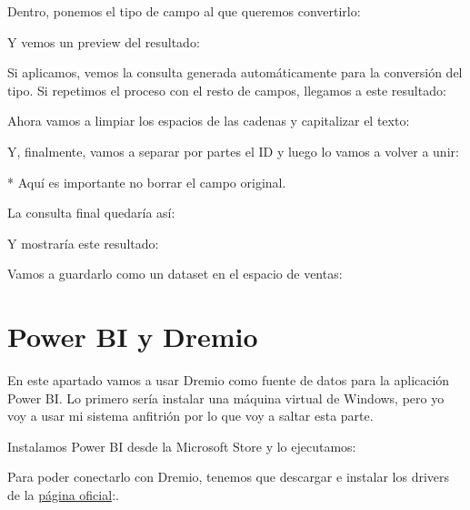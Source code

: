 \documentclass{../../../miPlantilla}
\begin{document}
Dentro, ponemos el tipo de campo al que queremos convertirlo:


Y vemos un preview del resultado:


\newpage

Si aplicamos, vemos la consulta generada automáticamente para la conversión del tipo. Si repetimos el proceso con el resto de campos, 
llegamos a este resultado:


Ahora vamos a limpiar los espacios de las cadenas y capitalizar el texto:


Y, finalmente, vamos a separar por partes el ID y luego lo vamos a volver a unir:


* Aquí es importante no borrar el campo original.


La consulta final quedaría así:


Y mostraría este resultado:


\newpage

Vamos a guardarlo como un dataset en el espacio de ventas:


\newpage

\section{Power BI y Dremio}
En este apartado vamos a usar Dremio como fuente de datos para la aplicación Power BI. Lo primero sería instalar una máquina virtual de Windows,
pero yo voy a usar mi sistema anfitrión por lo que voy a saltar esta parte.

Instalamos Power BI desde la Microsoft Store y lo ejecutamos:


Para poder conectarlo con Dremio, tenemos que descargar e instalar los drivers de la \href{https://dremio.com/drivers/odbc}{página oficial}:.
\end{document}
